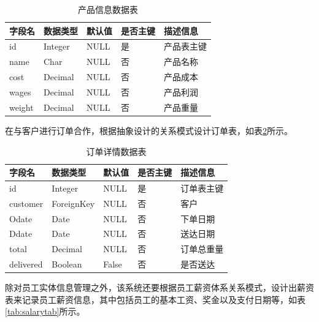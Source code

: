 \begin{table}[H]
    \centering
    \caption{产品信息数据表}
    \label{tab:product}
    \begin{tabularx}{.95\textwidth}{X<{\centering}X<{\centering}X<{\centering}X<{\centering}X<{\centering}}
        \toprule
        字段名 & 数据类型 & 默认值 & 是否主键 & 描述信息 \\
        \midrule
        id & Integer & NULL & 是 & 产品表主键 \\
        name & Char & NULL & 否 & 产品名称 \\
        cost & Decimal & NULL & 否 & 产品成本 \\
        wages & Decimal & NULL & 否 & 产品利润 \\
        weight & Decimal & NULL & 否 & 产品重量 \\
        \bottomrule
    \end{tabularx}
\end{table}

在与客户进行订单合作，根据抽象设计的关系模式设计订单表，如表\ref{tab:order}所示。

\begin{table}[H]
    \centering
    \caption{订单详情数据表}
    \label{tab:order}
    \begin{tabularx}{.95\textwidth}{X<{\centering}X<{\centering}X<{\centering}X<{\centering}X<{\centering}}
        \toprule
        字段名 & 数据类型 & 默认值 & 是否主键 & 描述信息 \\
        \midrule
        id & Integer & NULL & 是 & 订单表主键 \\
        customer & ForeignKey & NULL & 否 & 客户 \\
        Odate & Date & NULL & 否 & 下单日期 \\
        Ddate & Date & NULL & 否 & 送达日期 \\
        total & Decimal & NULL & 否 & 订单总重量 \\
        delivered & Boolean & False & 否 & 是否送达 \\
        \bottomrule
    \end{tabularx}
\end{table}

除对员工实体信息管理之外，该系统还要根据员工薪资体系关系模式，设计出薪资表来记录员工薪资信息，其中包括员工的基本工资、奖金以及支付日期等，如表\ref{tab:salarytab}所示。

